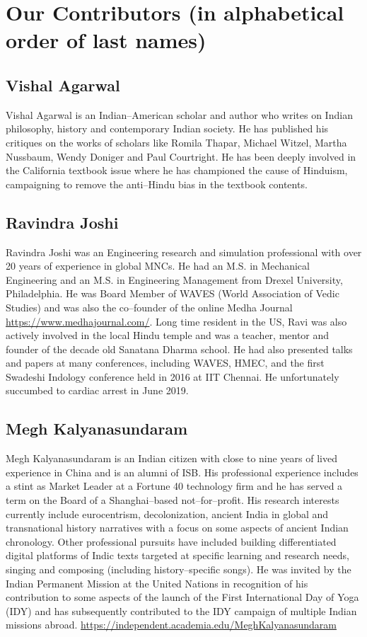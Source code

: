 
\chapter*{Our Contributors (in alphabetical order of last names)}\label{contributors}

\section*{Vishal Agarwal}

Vishal Agarwal is an Indian–American scholar and author who writes on Indian philosophy, history and contemporary Indian society. He has published his critiques on the works of scholars like Romila Thapar, Michael Witzel, Martha Nussbaum, Wendy Doniger and Paul Courtright. He has been deeply involved in the California textbook issue where he has championed the cause of Hinduism, campaigning to remove the anti–Hindu bias in the textbook contents.


\section*{Ravindra Joshi}

Ravindra Joshi was an Engineering research and simulation professional with over 20 years of experience in global MNCs. He had an M.S. in Mechanical Engineering and an M.S. in Engineering Management from Drexel University, Philadelphia. He was Board Member of WAVES (World Association of Vedic Studies) and was also the co–founder of the online Medha Journal \url{https://www.medhajournal.com/}. Long time resident in the US, Ravi was also actively involved in the local Hindu temple and was a teacher, mentor and founder of the decade old Sanatana Dharma school. He had also presented talks and papers at many conferences, including WAVES, HMEC, and the first Swadeshi Indology conference held in 2016 at IIT Chennai. He unfortunately succumbed to cardiac arrest in June 2019.


\section*{Megh Kalyanasundaram}

Megh Kalyanasundaram is an Indian citizen with close to nine years of lived experience in China and is an alumni of ISB. His professional experience includes a stint as Market Leader at a Fortune 40 technology firm and he has served a term on the Board of a Shanghai–based not–for–profit. His research interests currently include eurocentrism, decolonization, ancient India in global and transnational history narratives with a focus on some aspects of ancient Indian chronology. Other professional pursuits have included building differentiated digital platforms of Indic texts targeted at specific learning and research needs, singing and composing (including history–specific songs). He was invited by the Indian Permanent Mission at the United Nations in recognition of his contribution to some aspects of the launch of the First International Day of Yoga (IDY) and has subsequently contributed to the IDY campaign of multiple Indian missions abroad. \url{https://independent.academia.edu/MeghKalyanasundaram}


